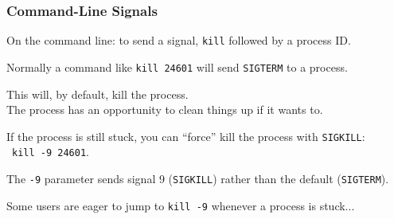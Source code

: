 \begin{frame}
	\frametitle{Command-Line Signals}

	On the command line: to send a signal, \texttt{kill} followed by a process ID.

	Normally a command like \texttt{kill 24601} will send \texttt{SIGTERM} to a process.

	This will, by default, kill the process.\\
	\quad The process has an opportunity to clean things up if it wants to.

	If the process is still stuck, you can ``force'' kill the process with \texttt{SIGKILL}:\\\ \quad \texttt{kill -9 24601}.

	The \texttt{-9} parameter sends signal 9 (\texttt{SIGKILL}) rather than the default (\texttt{SIGTERM}).

	Some users are eager to jump to \texttt{kill -9} whenever a process is stuck...
\end{frame}








